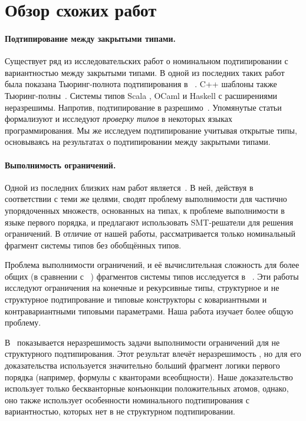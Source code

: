 \section{Обзор схожих работ}

\paragraph{Подтипирование между закрытыми типами.}
Существует ряд из исследовательских работ о номинальном подтипировании с вариантностью между закрытыми типами. В одной из последних таких работ была показана Тьюринг-полнота подтипирования в \java{}~\cite{grigore2017java}. C++ шаблоны также Тьюринг-полны~\cite{veldhuizen2003c++}. Системы типов Scala \cite{odersky2016scaling}, OCaml \cite{lillibridge1997translucent, rossberg1999undecidability} и Haskell с расширениями~\cite{sulzmann2007understanding} неразрешимы. Напротив, подтипирование в \dotnet{} разрешимо~\cite{emir2006variance,kennedy2006decidability}. Упомянутые статьи формализуют и исследуют \emph{проверку типов} в некоторых языках программирования. Мы же исследуем подтипирование учитывая открытые типы, основываясь на результатах о подтипировании между закрытыми типами.

\paragraph{Выполнимость ограничений.}
Одной из последних близких нам работ является~\cite{sherman2015deciding}. В ней, действуя в соответствии с  теми же целями, сводят проблему выполнимости для частично упорядоченных множеств, основанных на типах, к проблеме выполнимости в языке первого порядка, и предлагают использовать SMT-решатели для решения ограничений. В отличие от нашей работы, рассматривается только номинальный фрагмент системы типов \java{} без обобщённых типов.

Проблема выполнимости ограничений, и её вычислительная сложность для более общих (в сравнении с ~\cite{sherman2015deciding}) фрагментов системы типов исследуется в ~\cite{pratt1996satisfiability, frey1997satisfying, kuncak2003structural, niehren2005complexity}. Эти работы исследуют ограничения на конечные и рекурсивные типы, структурное и не структурное подтипрование и типовые конструкторы с ковариантными и контравариантными типовыми параметрами. Наша работа изучает более общую проблему.

В~\cite{su2002first} показывается неразрешимость задачи выполнимости ограничений для не структурного подтипирования. Этот результат влечёт неразрешимость \subtypesat{}, но для его доказательства используется значительно больший фрагмент логики первого порядка (например, формулы с кванторами всеобщности). Наше доказательство использует только бескванторные конъюнкции положительных атомов, однако, оно также использует особенности номинального подтипирования с вариантностью, которых нет в не структурном подтипировании.
